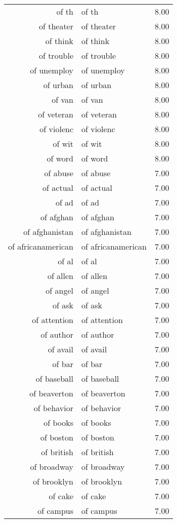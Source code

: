 \begin{table}[ht]
\begin{tabular}{rlr}
  of th & of th & 8.00 \\ 
  of theater & of theater & 8.00 \\ 
  of think & of think & 8.00 \\ 
  of trouble & of trouble & 8.00 \\ 
  of unemploy & of unemploy & 8.00 \\ 
  of urban & of urban & 8.00 \\ 
  of van & of van & 8.00 \\ 
  of veteran & of veteran & 8.00 \\ 
  of violenc & of violenc & 8.00 \\ 
  of wit & of wit & 8.00 \\ 
  of word & of word & 8.00 \\ 
  of abuse & of abuse & 7.00 \\ 
  of actual & of actual & 7.00 \\ 
  of ad & of ad & 7.00 \\ 
  of afghan & of afghan & 7.00 \\ 
  of afghanistan & of afghanistan & 7.00 \\ 
  of africanamerican & of africanamerican & 7.00 \\ 
  of al & of al & 7.00 \\ 
  of allen & of allen & 7.00 \\ 
  of angel & of angel & 7.00 \\ 
  of ask & of ask & 7.00 \\ 
  of attention & of attention & 7.00 \\ 
  of author & of author & 7.00 \\ 
  of avail & of avail & 7.00 \\ 
  of bar & of bar & 7.00 \\ 
  of baseball & of baseball & 7.00 \\ 
  of beaverton & of beaverton & 7.00 \\ 
  of behavior & of behavior & 7.00 \\ 
  of books & of books & 7.00 \\ 
  of boston & of boston & 7.00 \\ 
  of british & of british & 7.00 \\ 
  of broadway & of broadway & 7.00 \\ 
  of brooklyn & of brooklyn & 7.00 \\ 
  of cake & of cake & 7.00 \\ 
  of campus & of campus & 7.00 \\ 

\end{tabular}
\end{table}
